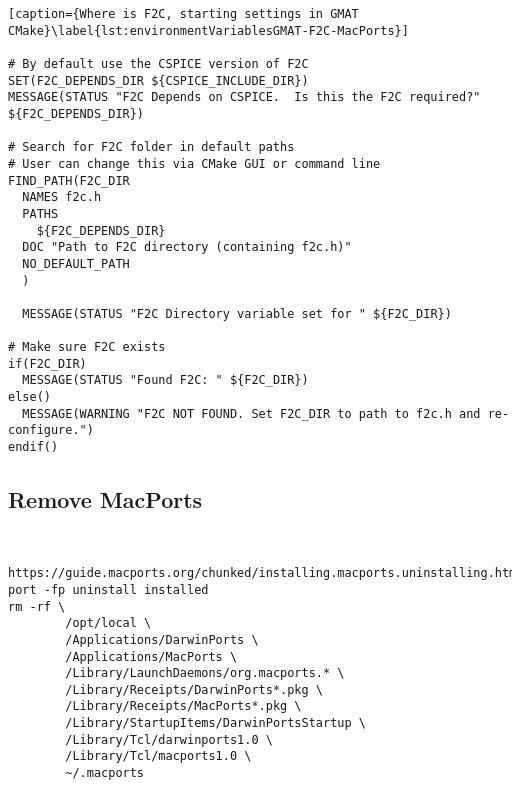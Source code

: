 \documentclass[
  a4paper, %
  11pt, %
  twoside,    %
  onecolumn,  %
  openright,  %
]{memoir}
\begin{document}
\begin{tiny}
\begin{lstlisting}[caption={Where is F2C, starting settings in GMAT CMake}\label{lst:environmentVariablesGMAT-F2C-MacPorts}]

# By default use the CSPICE version of F2C
SET(F2C_DEPENDS_DIR ${CSPICE_INCLUDE_DIR})
MESSAGE(STATUS "F2C Depends on CSPICE.  Is this the F2C required?" ${F2C_DEPENDS_DIR})

# Search for F2C folder in default paths
# User can change this via CMake GUI or command line
FIND_PATH(F2C_DIR
  NAMES f2c.h
  PATHS 
    ${F2C_DEPENDS_DIR}
  DOC "Path to F2C directory (containing f2c.h)"
  NO_DEFAULT_PATH
  )
  
  MESSAGE(STATUS "F2C Directory variable set for " ${F2C_DIR})

# Make sure F2C exists
if(F2C_DIR)
  MESSAGE(STATUS "Found F2C: " ${F2C_DIR})
else()
  MESSAGE(WARNING "F2C NOT FOUND. Set F2C_DIR to path to f2c.h and re-configure.")
endif()	
\end{lstlisting}	
\end{tiny}




\subsection{Remove MacPorts} %
\label{sub:remove_macports}

\begin{tiny}
	\begin{lstlisting}

 https://guide.macports.org/chunked/installing.macports.uninstalling.html
port -fp uninstall installed
rm -rf \
        /opt/local \
        /Applications/DarwinPorts \
        /Applications/MacPorts \
        /Library/LaunchDaemons/org.macports.* \
        /Library/Receipts/DarwinPorts*.pkg \
        /Library/Receipts/MacPorts*.pkg \
        /Library/StartupItems/DarwinPortsStartup \
        /Library/Tcl/darwinports1.0 \
        /Library/Tcl/macports1.0 \
        ~/.macports		
	\end{lstlisting}
\end{tiny}
\end{document}
